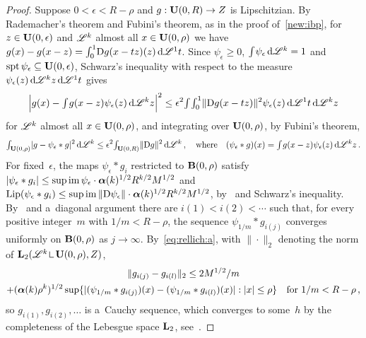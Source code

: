 \begin{proof}
    Suppose $0 < \epsilon < R - \rho$ and $g : \mathbf{U}(0,R) \to Z$ is Lipschitzian. By Rademacher's
    theorem and Fubini's theorem, as in the proof of~\ref{new:ibp}, for $z \in
    \mathbf{U}(0,\epsilon)$ and $\mathscr{L}^{k}$ almost all $x \in \mathbf{U}(0,\rho)$ we have $g(x) - g(x -
    z) = {\textstyle\int_{0}^{1}} \mathrm{D} g(x - t z)(z) \,\mathrm{d} \mathscr{L}^1 t$. Since $\psi_\epsilon \ge 0$, ${\textstyle\int_{}^{}}
    \psi_\epsilon \,\mathrm{d} \mathscr{L}^{k} = 1$ and $\operatorname{spt} \psi_\epsilon \subseteq \mathbf{U}(0,\epsilon)$,
    Schwarz's inequality with respect to the measure $\psi_\epsilon(z) \,\mathrm{d} \mathscr{L}^{k} z \,\mathrm{d} \mathscr{L}^1
    t$ gives
    \begin{displaymath}
        \Big| g(x) - {\textstyle\int_{}^{}} g(x - z) \psi_\epsilon(z) \,\mathrm{d} \mathscr{L}^{k} z \Big|^2 \le
        \epsilon^2 {\textstyle\int_{}^{}} {\textstyle\int_{0}^{1}} \|\mathrm{D} g(x - t z)\|^2 \psi_\epsilon(z) \,\mathrm{d} \mathscr{L}^1 t \,\mathrm{d}
        \mathscr{L}^{k} z
    \end{displaymath}
    for $\mathscr{L}^{k}$ almost all $x \in \mathbf{U}(0,\rho)$, and integrating over $\mathbf{U}(0,\rho)$,
    by Fubini's theorem,
    \begin{equation}
        \label{eq:rellich:a}
        {\textstyle\int_{\mathbf{U}(0,\rho)}^{}} |g - \psi_\epsilon \ast g|^2 \,\mathrm{d} \mathscr{L}^{k} \le \epsilon^2
        {\textstyle\int_{\mathbf{U}(0,R)}^{}} \|\mathrm{D} g\|^2 \,\mathrm{d} \mathscr{L}^{k} \,, \quad \text{where} \quad
        (\psi_\epsilon \ast g)(x) = {\textstyle\int_{}^{}} g(x - z) \psi_\epsilon(z) \,\mathrm{d} \mathscr{L}^{k} z \,.
    \end{equation}
    For fixed~$\epsilon$, the maps $\psi_\epsilon \ast g_i$ restricted to $\mathbf{B}(0,\rho)$ satisfy
    $|\psi_\epsilon \ast g_i| \le \sup \operatorname{im} \psi_\epsilon \cdot \boldsymbol{\alpha}(k)^{1/2} R^{k/2} M^{1/2}$ and
    $\operatorname{Lip} (\psi_\epsilon \ast g_i) \le \sup \operatorname{im} \|\mathrm{D} \psi_\epsilon\| \cdot \boldsymbol{\alpha}(k)^{1/2}
    R^{k/2} M^{1/2}$, by~\cite[4.1.2]{Federer1969} and Schwarz's inequality. By~\cite[2.10.21]{Federer1969}
    and a~diagonal argument there are $i(1) < i(2) < \cdots$ such that, for every positive
    integer~$m$ with $1/m < R - \rho$, the sequence $\psi_{1/m} \ast g_{i(j)}$ converges uniformly on
    $\mathbf{B}(0,\rho)$ as $j \to \infty$. By~\eqref{eq:rellich:a}, with $\|\cdot\|_2$ denoting the
    norm of $\Lp{2}(\LM^{\vdim} \restrict \oball{0}{\rho}, Z)$,
    \begin{multline*}
        \|g_{i(j)} - g_{i(l)}\|_2 \le 2 M^{1/2} / m \\ + (\boldsymbol{\alpha}(k) \rho^{k})^{1/2} \sup
        \{ |(\psi_{1/m} \ast g_{i(j)})(x) - (\psi_{1/m} \ast g_{i(l)})(x)| : |x| \le \rho \}
        \quad \text{for $1/m < R - \rho$} \,,
    \end{multline*}
    so $g_{i(1)}, g_{i(2)}, \ldots$ is a~Cauchy sequence, which converges to some~$h$ by the
    completeness of the Lebesgue space $\mathbf{L}_{2}$, see~\cite[2.4.12]{Federer1969}.
\end{proof}

